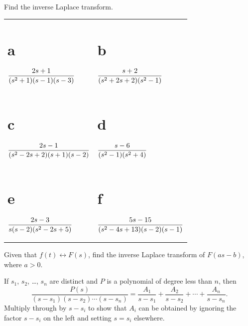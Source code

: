 \begin{exerciselist}
  \item\label{exer:8.2.8} Find the inverse Laplace transform.

  \begin{tabular}[t]{@{}p{168pt}@{}p{168pt}}
    \part{a} $\displaystyle\frac{2s+1}{(s^{2}+1)(s-1)(s-3)}$    & \part{b} $\displaystyle\frac{s+2}{(s^{2}+2s+2)(s^{2}-1)}$     \\[10pt]
    \part{c} $\displaystyle\frac{2s-1}{(s^{2}-2s+2)(s+1)(s-2)}$ & \part{d} $\displaystyle\frac{s-6}{(s^{2}-1)(s^{2}+4)}$        \\[10pt]
    \part{e} $\displaystyle\frac{2s-3}{s(s-2)(s^{2}-2s+5)}$     & \part{f} $\displaystyle\frac{5s-15}{(s^{2}-4s+13)(s-2)(s-1)}$ \\[10pt]
  \end{tabular}

  \item\label{exer:8.2.9} Given that $f(t)\leftrightarrow F(s)$, find the inverse Laplace transform
        of $F(as-b)$, where $a>0$.

  \item\label{exer:8.2.10}
  \begin{alist}
    \item %
    If $s_{1}$, $s_{2}$, \dots, $s_{n}$ are distinct and $P$ is a polynomial of degree less than
    $n$, then
    \[
      \frac{P(s)}{(s-s_{1})(s-s_{2})\cdots(s-s_{n})}= \frac{A_{1}}{s-s_{1}}+\frac{A_{2}}{s-s_{2}}+\cdots+\frac{A_{n}}{s-s_{n}}.
    \]
    Multiply through by $s-s_{i}$ to show that $A_{i}$ can be obtained by ignoring the factor
    $s-s_{i}$ on the left and setting $s=s_{i}$ elsewhere.


\end{alist}
\end{exerciselist}
